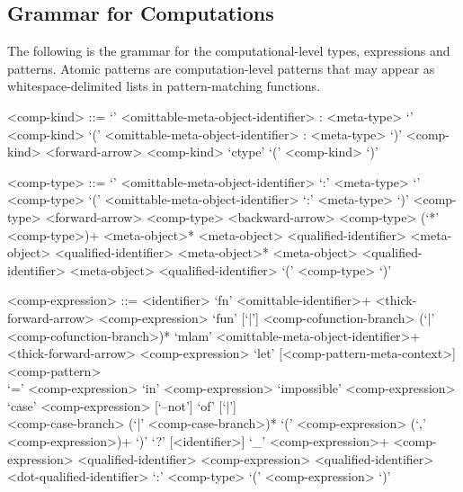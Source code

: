 \subsection{Grammar for Computations}\label{section:syntax-computations}

The following is the grammar for the computational-level types, expressions and patterns.
Atomic patterns are computation-level patterns that may appear as whitespace-delimited lists in pattern-matching functions.

\begin{grammar}
<comp-kind> ::= `{' <omittable-meta-object-identifier> : <meta-type> `}' <comp-kind>
\alt `(' <omittable-meta-object-identifier> : <meta-type> `)' <comp-kind>
 <forward-arrow> <comp-kind>
\alt `ctype'
\alt `(' <comp-kind> `)'

<comp-type> ::= `{' <omittable-meta-object-identifier> `:' <meta-type> `}' <comp-type>
\alt `(' <omittable-meta-object-identifier> `:' <meta-type> `)' <comp-type>
 <forward-arrow> <comp-type>
 <backward-arrow> <comp-type>
 (`*' <comp-type>)+
 <meta-object>*
 <meta-object>
 <qualified-identifier> <meta-object>
 <qualified-identifier>
 <meta-object>*
 <meta-object>
 <qualified-identifier> <meta-object>
 <qualified-identifier>
\alt `(' <comp-type> `)'

<comp-expression> ::= <identifier>
\alt `fn' <omittable-identifier>+ <thick-forward-arrow> <comp-expression>
\alt `fun' [`|'] <comp-cofunction-branch> (`|' <comp-cofunction-branch>)*
\alt `mlam' <omittable-meta-object-identifier>+\\
<thick-forward-arrow> <comp-expression>
\alt `let' [<comp-pattern-meta-context>] <comp-pattern>\\
`=' <comp-expression> `in' <comp-expression>
\alt `impossible' <comp-expression>
\alt `case' <comp-expression> [`--not'] `of' [`|']\\
<comp-case-branch> (`|' <comp-case-branch>)*
\alt `(' <comp-expression> (`,' <comp-expression>)+ `)'
\alt `?' [<identifier>]
\alt `_'
 <comp-expression>+
 <comp-expression>
 <qualified-identifier> <comp-expression>
 <qualified-identifier>
 <dot-qualified-identifier>
 `:' <comp-type>
\alt `(' <comp-expression> `)'


\end{grammar}
